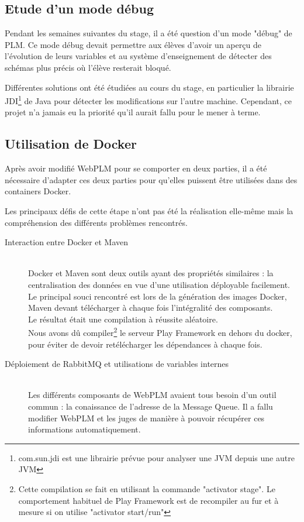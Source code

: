 \documentclass[stage]{tnreport}
\begin{document}
\subsection{Etude d'un mode débug}

Pendant les semaines suivantes du stage, il a été question d'un mode "débug" de PLM. Ce mode débug devait permettre aux élèves d'avoir un aperçu de l'évolution de leurs variables et au système d'enseignement de détecter des schémas plus précis où l'élève resterait bloqué.

Différentes solutions ont été étudiées au cours du stage, en particulier la librairie JDI\cite{JDI}\footnote{com.sun.jdi est une librairie prévue pour analyser une JVM depuis une autre JVM} de Java pour détecter les modifications sur l'autre machine. Cependant, ce projet n'a jamais eu la priorité qu'il aurait fallu pour le mener à terme.

\subsection{Utilisation de Docker}

Après avoir modifié WebPLM pour se comporter en deux parties, il a été nécessaire d'adapter ces deux parties pour qu'elles puissent être utilisées dans des containers Docker.

Les principaux défis de cette étape n'ont pas été la réalisation elle-même mais la compréhension des différents problèmes rencontrés.

\begin{description}
	\item[Interaction entre Docker et Maven] \hfill \\
		Docker et Maven sont deux outils ayant des propriétés similaires : la centralisation des données en vue d'une utilisation déployable facilement. Le principal souci rencontré est lors de la génération des images Docker, Maven devant télécharger à chaque fois l'intégralité des composants.
		\hfill \\
		Le résultat était une compilation à réussite aléatoire. \hfill \\
		Nous avons dû compiler\footnote{Cette compilation se fait en utilisant la commande "activator stage". Le comportement habituel de Play Framework est de recompiler au fur et à mesure si on utilise "activator start/run"} le serveur Play Framework en dehors du docker, pour éviter de devoir retélécharger les dépendances à chaque fois.
	\item[Déploiement de RabbitMQ et utilisations de variables internes] \hfill \\
		Les différents composants de WebPLM avaient tous besoin d'un outil commun : la conaissance de l'adresse de la Message Queue. Il a fallu modifier WebPLM et les juges de manière à pouvoir récupérer ces informations automatiquement.
\end{description}
\end{document}
